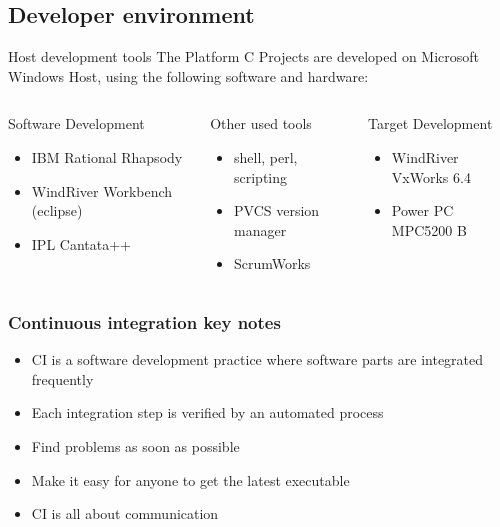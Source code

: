\documentclass{beamer}
\begin{document}
\subsection[Developer environment]{Developer environment}
\begin{frame}{Host development tools}
The Platform C Projects are developed on Microsoft Windows Host, using the
following software and hardware:
\begin{columns}
	\begin{block}{Software Development}
	\begin{itemize}
		\item<1-> IBM Rational Rhapsody
  		\item<2-> WindRiver Workbench (eclipse) 
  		\item<3-> IPL Cantata++
    \end{itemize}
    \end{block}

	\begin{block}{Other used tools}
	\begin{itemize}
      \item<4-> shell, perl, scripting
      \item<5-> PVCS version manager
      \item<6-> ScrumWorks 
    \end{itemize}
    \end{block}

	\begin{block}{Target Development}
	\begin{itemize}
      \item<7->WindRiver VxWorks 6.4
  	  \item<8-> Power PC MPC5200 B
    \end{itemize}
    \end{block}
\end{columns}
\end{frame}

\begin{frame}
\frametitle{Continuous integration key notes}
\begin{itemize}
  \item CI is a software development practice where software parts are
  integrated frequently
  \item Each integration step is verified by an automated process
  \item Find problems as soon as possible
  \item Make it easy for anyone to get the latest executable
  \item CI is all about communication
\end{itemize}
\end{frame}
\end{document}
